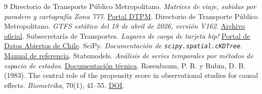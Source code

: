 \documentclass[11pt,a4paper]{article}
\begin{document}
\begin{thebibliography}{9}
\small
\setlength{\itemsep}{2pt}
 Directorio de Transporte Público Metropolitano. \emph{Matrices de viaje, subidas por paradero y cartografía Zona 777}. \href{https://www.dtpm.cl/index.php/documentos/matrices-de-viaje}{Portal DTPM}.
 Directorio de Transporte Público Metropolitano. \emph{GTFS estático del 18 de abril de 2026, versión V162}. \href{https://www.dtpm.cl/descargas/gtfs/GTFS_20260418.zip}{Archivo oficial}.
 Subsecretaría de Transportes. \emph{Lugares de carga de tarjeta bip!} \href{https://datos.gob.cl/es/group/transporte}{Portal de Datos Abiertos de Chile}.
 SciPy. \emph{Documentación de \texttt{scipy.spatial.cKDTree}}. \href{https://docs.scipy.org/doc/scipy/reference/generated/scipy.spatial.cKDTree.html}{Manual de referencia}.
 Statsmodels. \emph{Análisis de series temporales por métodos de espacio de estados}. \href{https://www.statsmodels.org/stable/statespace.html}{Documentación técnica}.
 Rosenbaum, P. R. y Rubin, D. B. (1983). The central role of the propensity score in observational studies for causal effects. \emph{Biometrika}, 70(1), 41--55. \href{https://doi.org/10.1093/biomet/70.1.41}{DOI}.
\end{thebibliography}
\end{document}
